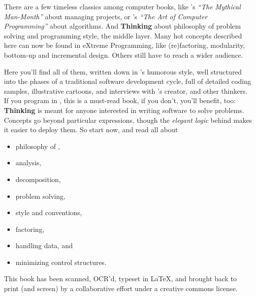 
\noindent
There are a few timeless classics among computer books, like 's \emph{``The Mythical Man-Month''} about managing projects, or
's \emph{``The Art of Computer Programming''} about
algorithms. And \textbf{Thinking \Forth} about philosophy of problem
solving and programming style, the middle layer. Many hot concepts
described here can now be found in eXtreme Programming, like
(re)factoring, modularity, bottom-up and incremental design. Others
still have to reach a wider audience.

Here you'll find all of them, written down in 's
humorous style, well structured into the phases of a traditional
software development cycle, full of detailed coding samples,
illustrative cartoons, and interviews with \Forth's creator,
 and other
\Forth{} thinkers. If you program in \Forth{}, this is a must-read book,
if you don't, you'll benefit, too: \textbf{Thinking \Forth{}} is meant
for anyone interested in writing software to solve problems.  Concepts
go beyond particular expressions, though the \emph{elegant logic}
behind \Forth{} makes it easier to deploy them. So start now, and read
all about
\begin{itemize}
\item philosophy of \Forth{},
\item analysis,
\item decomposition,
\item problem solving,
\item style and conventions,
\item factoring,
\item handling data, and
\item minimizing control structures.
\end{itemize}

This book has been scanned, OCR'd, typeset in \LaTeX{}, and brought
back to print (and screen) by a collaborative effort under a creative
commons license.


